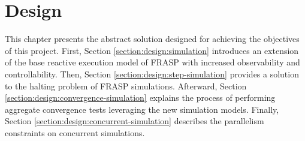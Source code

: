 
\chapter{Design}
\label{chapter:design}

This chapter presents the abstract solution designed for achieving the
objectives of this project. First, Section \ref{section:design:simulation}
introduces an extension of the base reactive execution model of FRASP with
increased observability and controllability. Then, Section
\ref{section:design:step-simulation} provides a solution to the halting problem
of FRASP simulations. Afterward, Section
\ref{section:design:convergence-simulation} explains the process of performing
aggregate convergence tests leveraging the new simulation models. Finally,
Section \ref{section:design:concurrent-simulation} describes the parallelism
constraints on concurrent simulations.




